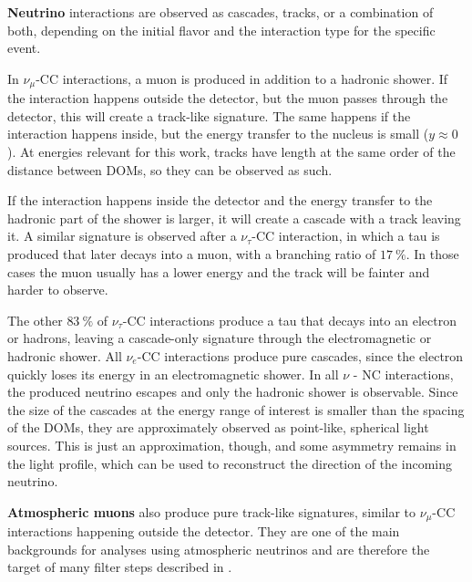 \textbf{Neutrino} interactions are observed as cascades, tracks, or a combination of both, depending on the initial flavor and the interaction type for the specific event.

In $\nu_\mu$-CC interactions, a muon is produced in addition to a hadronic shower. If the interaction happens outside the detector, but the muon passes through the detector, this will create a track-like signature. The same happens if the interaction happens inside, but the energy transfer to the nucleus is small ($y \approx 0$). At energies relevant for this work, tracks have length at the same order of the distance between DOMs, so they can be observed as such.

If the interaction happens inside the detector and the energy transfer to the hadronic part of the shower is larger, it will create a cascade with a track leaving it. A similar signature is observed after a $\nu_\tau$-CC interaction, in which a tau is produced that later decays into a muon, with a branching ratio of $\SI{17}{\percent}$. In those cases the muon usually has a lower energy and the track will be fainter and harder to observe.

The other $\SI{83}{\percent}$ of $\nu_\tau$-CC interactions produce a tau that decays into an electron or hadrons, leaving a cascade-only signature through the electromagnetic or hadronic shower. All $\nu_e$-CC interactions produce pure cascades, since the electron quickly loses its energy in an electromagnetic shower. In all $\nu$ - NC interactions, the produced neutrino escapes and only the hadronic shower is observable. Since the size of the cascades at the energy range of interest is smaller than the spacing of the DOMs, they are approximately observed as point-like, spherical light sources. This is just an approximation, though, and some asymmetry remains in the light profile, which can be used to reconstruct the direction of the incoming neutrino.


\textbf{Atmospheric muons} also produce pure track-like signatures, similar to $\nu_\mu$-CC interactions happening outside the detector. They are one of the main backgrounds for analyses using atmospheric neutrinos and are therefore the target of many filter steps described in .
